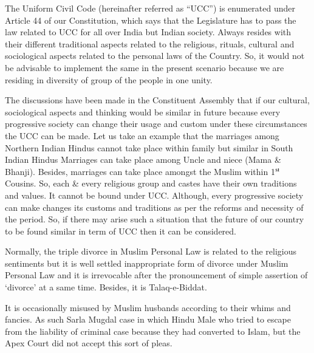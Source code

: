 \setcounter{figure}{0}
\setcounter{table}{0}
\setcounter{footnote}{0}




\begin{multicols}{2}


\noi
The Uniform Civil Code (hereinafter referred as “UCC”) is enumerated under Article 44 of
our Constitution, which says that the Legislature has to pass the law related to UCC for all
over India but Indian society. Always resides with their different traditional aspects related to
the religious, rituals, cultural and sociological aspects related to the personal laws of the
Country. So, it would not be advisable to implement the same in the present scenario because
we are residing in diversity of group of the people in one unity.


The discussions have been made in the Constituent Assembly that if our cultural, sociological
aspects and thinking would be similar in future because every progressive society can change
their usage and custom under these circumstances the UCC can be made. Let us take an
example that the marriages among Northern Indian Hindus cannot take place within family
but similar in South Indian Hindus Marriages can take place among Uncle and niece (Mama
\& Bhanji). Besides, marriages can take place amongst the Muslim within 1$^{\rm st}$ Cousins. So,
each \& every religious group and castes have their own traditions and values. It cannot be
bound under UCC. Although, every progressive society can make changes its customs and
traditions as per the reforms and necessity of the period. So, if there may arise such a
situation that the future of our country to be found similar in term of UCC then it can be
considered.

Normally, the triple divorce in Muslim Personal Law is related to the religious sentiments but
it is well settled inappropriate form of divorce under Muslim Personal Law and it is
irrevocable after the pronouncement of simple assertion of ‘divorce’ at a same time. Besides,
it is Talaq-e-Biddat.

It is occasionally misused by Muslim husbands according to their whims and fancies. As such
Sarla Mugdal case in which Hindu Male who tried to escape from the liability of criminal case because they had converted to Islam, but the Apex Court did not accept this sort of
pleas.


\end{multicols}
